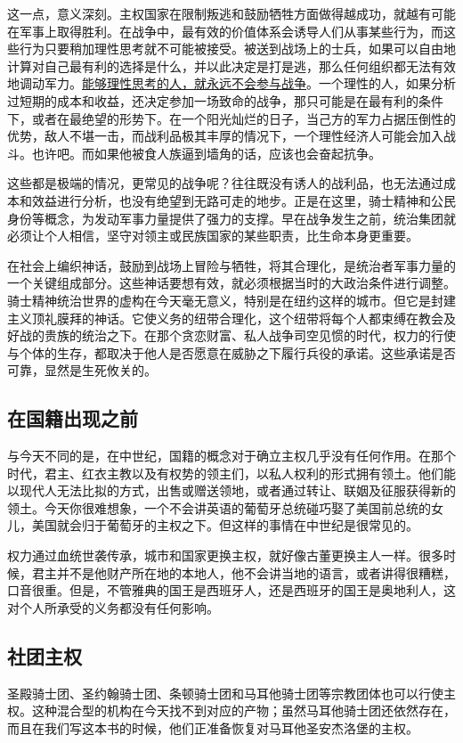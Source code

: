 这一点，意义深刻。主权国家在限制叛逃和鼓励牺牲方面做得越成功，就越有可能在军事上取得胜利。在战争中，最有效的价值体系会诱导人们从事某些行为，而这些行为只要稍加理性思考就不可能被接受。被送到战场上的士兵，如果可以自由地计算对自己最有利的选择是什么，并以此决定是打是逃，那么任何组织都无法有效地调动军力。\uline{能够理性思考的人，就永远不会参与战争}。一个理性的人，如果分析过短期的成本和收益，还决定参加一场致命的战争，那只可能是在最有利的条件下，或者在最绝望的形势下。在一个阳光灿烂的日子，当己方的军力占据压倒性的优势，敌人不堪一击，而战利品极其丰厚的情况下，一个理性经济人可能会加入战斗。也许吧。而如果他被食人族逼到墙角的话，应该也会奋起抗争。

这些都是极端的情况，更常见的战争呢？往往既没有诱人的战利品，也无法通过成本和效益进行分析，也没有绝望到无路可走的地步。正是在这里，骑士精神和公民身份等概念，为发动军事力量提供了强力的支撑。早在战争发生之前，统治集团就必须让个人相信，坚守对领主或民族国家的某些职责，比生命本身更重要。

在社会上编织神话，鼓励到战场上冒险与牺牲，将其合理化，是统治者军事力量的一个关键组成部分。这些神话要想有效，就必须根据当时的大政治条件进行调整。骑士精神统治世界的虚构在今天毫无意义，特别是在纽约这样的城市。但它是封建主义顶礼膜拜的神话。它使义务的纽带合理化，这个纽带将每个人都束缚在教会及好战的贵族的统治之下。在那个贪恋财富、私人战争司空见惯的时代，权力的行使与个体的生存，都取决于他人是否愿意在威胁之下履行兵役的承诺。这些承诺是否可靠，显然是生死攸关的。

\subsection{在国籍出现之前}
与今天不同的是，在中世纪，国籍的概念对于确立主权几乎没有任何作用。在那个时代，君主、红衣主教以及有权势的领主们，以私人权利的形式拥有领土。他们能以现代人无法比拟的方式，出售或赠送领地，或者通过转让、联姻及征服获得新的领土。今天你很难想象，一个不会讲英语的葡萄牙总统碰巧娶了美国前总统的女儿，美国就会归于葡萄牙的主权之下。但这样的事情在中世纪是很常见的。

权力通过血统世袭传承，城市和国家更换主权，就好像古董更换主人一样。很多时候，君主并不是他财产所在地的本地人，他不会讲当地的语言，或者讲得很糟糕，口音很重。但是，不管雅典的国王是西班牙人，还是西班牙的国王是奥地利人，这对个人所承受的义务都没有任何影响。

\subsection{社团主权}
圣殿骑士团、圣约翰骑士团、条顿骑士团和马耳他骑士团等宗教团体也可以行使主权。这种混合型的机构在今天找不到对应的产物；虽然马耳他骑士团还依然存在，而且在我们写这本书的时候，他们正准备恢复对马耳他圣安杰洛堡的主权。

